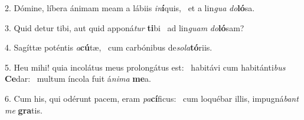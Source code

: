 2. Dómine, líbera ánimam meam a lábiis \textit{in}\textbf{í}quis, \ast\  et a lin\textit{gua} \textit{do}\textbf{ló}sa.\

3. Quid detur tibi, aut quid apponá\textit{tur} \textbf{ti}bi \ast\  ad lin\textit{guam} \textit{do}\textbf{ló}sam?\

4. Sagíttæ poténtis \textit{a}\textbf{cú}tæ, \ast\  cum carbónibus de\textit{so}\textit{la}\textbf{tó}riis.\

5. Heu mihi! quia incolátus meus prolongátus est: \dag\  habitávi cum habitánti\textit{bus} \textbf{Ce}dar: \ast\  multum íncola fuit á\textit{ni}\textit{ma} \textbf{me}a.\

6. Cum his, qui odérunt pacem, eram \textit{pa}\textbf{cí}ficus: \ast\  cum loquébar illis, impugná\textit{bant} \textit{me} \textbf{gra}tis.\

